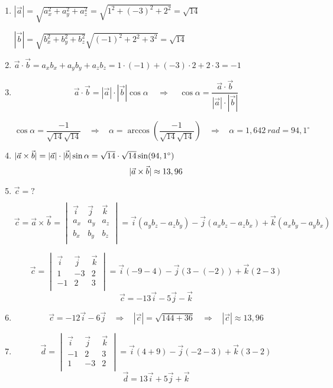 

\begin{enumerate}[label=\alph*)]
 \item 
 $|\vec{a}|=\sqrt{a_x^2+a_y^2+a_z^2}=\sqrt{1^2+(-3)^2+2^2}=\sqrt{14}$
 
 $|\vec{b}|=\sqrt{b_x^2+b_y^2+b_z^2}\sqrt{(-1)^2+2^2+3^2}=\sqrt{14}$
 
 \item $\vec{a} \cdot \vec{b}=a_xb_x+a_yb_y+a_zb_z=1\cdot(-1)+(-3)\cdot2+2\cdot3=-1  $
 
 \item   $$\vec{a} \cdot \vec{b}=|\vec{a}| \cdot| \vec{b}|\cos\alpha \ \ \ \ \ \Rightarrow  \ \ \ \ \  \cos\alpha=\frac{\vec{a} \cdot \vec{b}}{|\vec{a}| \cdot| \vec{b}|}$$
 
 $$\cos\alpha=\frac{-1}{\sqrt{14}\sqrt{14}} \ \ \ \ \Rightarrow  \ \ \ \  \alpha=\arccos \left( \frac{-1}{\sqrt{14}  \sqrt{14}} \right) 
  \ \ \ \ \Rightarrow  \ \ \ \   \alpha=1,642\ rad=94,1^\circ$$
 
 
 
 \item $\arrowvert \vec{a} \times \vec{b}  \arrowvert =  |\vec{a}| \cdot| \vec{b}|\sin\alpha =\sqrt{14}\cdot\sqrt{14} \sin(94,1^\circ)   $
 $$\arrowvert \vec{a} \times \vec{b}  \arrowvert \approx 13,96$$
 
 
 \item $  \vec{c} =?$
 
 $$\vec{c}=\vec{a} \times \vec{b}=
 \begin{vmatrix}
  \vec{i} & \vec{j} & \vec{k} \\
  a_x  & a_y  & a_z  \\
  b_x  & b_y  & b_z  \\
 \end{vmatrix}
 =\vec{i}(a_yb_z-a_zb_y)-\vec{j}(a_xb_z-a_zb_x) + \vec{k}(a_xb_y-a_yb_x)
 $$
 
 $$\vec{c}=
 \begin{vmatrix}
   \vec{i} & \vec{j} & \vec{k} \\
   1 & -3 & 2 \\
   -1 & 2 & 3 \\
 \end{vmatrix}
 =\vec{i}(-9-4)-\vec{j}(3-(-2))+ \vec{k}(2-3) $$
  $$\vec{c}= -13\vec{i}-5\vec{j} -\vec{k}$$
 \item 
 $$\vec{c}= -12\vec{i}-6\vec{j}  \ \ \ \ \Rightarrow  \ \ \ \ |\vec{c}|=\sqrt{144+36} \ \ \ \ \Rightarrow  \ \ \ \ |\vec{c}|\approx13,96 $$
 \item 
 $$\vec{d}=
 \begin{vmatrix}
   \vec{i} & \vec{j} & \vec{k} \\
   -1 & 2 & 3 \\
   1 & -3 & 2 \\
 \end{vmatrix}
 =\vec{i}(4+9)-\vec{j}(-2-3)+ \vec{k}(3-2) $$
  $$\vec{d}= 13\vec{i}+5\vec{j} + \vec{k}$$

\end{enumerate}
